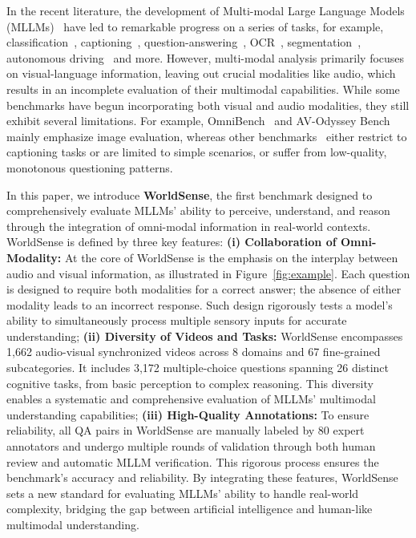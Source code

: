 In the recent literature, the development of Multi-modal Large Language Models (MLLMs)~\cite{openai2023gpt,hurst2024gpt,openai2024gptv,team2023gemini,team2024reka,zhang2023llama,ma2024visual,fang2023instructseq} have led to remarkable progress on a series of tasks, for example, classification~\cite{liu2024revisiting}, captioning~\cite{alayrac2022flamingo,dai2023instructblip,liu2024visual}, question-answering~\cite{tang2024mtvqa,panagopoulou2023x,liu2024mmdu}, OCR~\cite{mathew2021docvqa,zhang2024vcr}, segmentation~\cite{lai2024lisa,xia2024gsva,he2024multi}, autonomous driving~\cite{nie2025reason2drive,sima2025drivelm,chen2024driving} and more. However, multi-modal analysis  primarily focuses on visual-language information, leaving out crucial modalities like audio, which results in an incomplete evaluation of their multimodal capabilities. While some benchmarks have begun incorporating both visual and audio modalities, they still exhibit several limitations. For example, OmniBench~\cite{li2024omnibench} and AV-Odyssey Bench~\cite{gong2024av} mainly emphasize image evaluation, whereas other benchmarks~\cite{geng2024longvale,li2022learning,yang2022avqa} either restrict to captioning tasks or are limited to simple scenarios, 
or suffer from low-quality, monotonous questioning patterns. 


In this paper, we introduce \textbf{WorldSense}, the first benchmark designed to comprehensively evaluate MLLMs’ ability to perceive, understand, and reason through the integration of omni-modal information in real-world contexts. WorldSense is defined by three key features: 
\textbf{(i) Collaboration of Omni-Modality:} At the core of WorldSense is the emphasis on the interplay between audio and visual information, as illustrated in Figure~\ref{fig:example}. Each question is designed to require both modalities for a correct answer; the absence of either modality leads to an incorrect response. Such design rigorously tests a model’s ability to simultaneously process multiple sensory inputs for accurate understanding; 
\textbf{(ii) Diversity of Videos and Tasks:} WorldSense encompasses 1,662 audio-visual synchronized videos across 8 domains and 67 fine-grained subcategories. It includes 3,172 multiple-choice questions spanning 26 distinct cognitive tasks, from basic perception to complex reasoning. This diversity enables a systematic and comprehensive evaluation of MLLMs’ multimodal understanding capabilities;
\textbf{(iii) High-Quality Annotations:} To ensure reliability, all QA pairs in WorldSense are manually labeled by 80 expert annotators and undergo multiple rounds of validation through both human review and automatic MLLM verification. This rigorous process ensures the benchmark’s accuracy and reliability. By integrating these features, WorldSense sets a new standard for evaluating MLLMs’ ability to handle real-world complexity, bridging the gap between artificial intelligence and human-like multimodal understanding.

